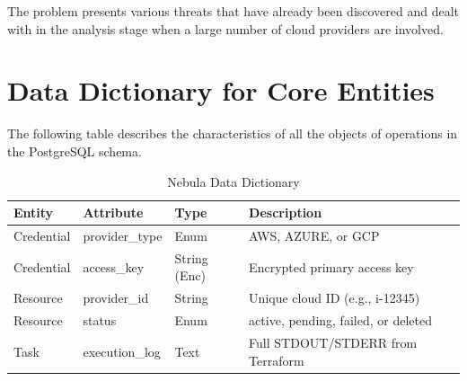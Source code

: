 The problem presents various threats that have already been discovered and dealt with in the analysis stage when a large number of cloud providers are involved.

\section{Data Dictionary for Core Entities}
The following table describes the characteristics of all the objects of operations in the PostgreSQL schema.

\begin{table}
\centering
\caption{Nebula Data Dictionary}
\label{tab:dictionary}
\begin{tabular}{|l|l|l|l|}
\hline
\textbf{Entity} & \textbf{Attribute} & \textbf{Type} & \textbf{Description} \\ \hline
Credential & provider\_type & Enum & AWS, AZURE, or GCP \\ \hline
Credential & access\_key & String (Enc) & Encrypted primary access key \\ \hline
Resource & provider\_id & String & Unique cloud ID (e.g., i-12345) \\ \hline
Resource & status & Enum & active, pending, failed, or deleted \\ \hline
Task & execution\_log & Text & Full STDOUT/STDERR from Terraform \\ \hline
\end{tabular}
\end{table}

\newpage
